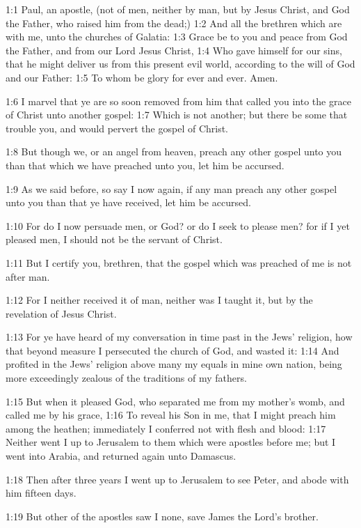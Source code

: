 

1:1 Paul, an apostle, (not of men, neither by man, but by Jesus
Christ, and God the Father, who raised him from the dead;) 1:2 And all
the brethren which are with me, unto the churches of Galatia: 1:3
Grace be to you and peace from God the Father, and from our Lord Jesus
Christ, 1:4 Who gave himself for our sins, that he might deliver us
from this present evil world, according to the will of God and our
Father: 1:5 To whom be glory for ever and ever. Amen.

1:6 I marvel that ye are so soon removed from him that called you into
the grace of Christ unto another gospel: 1:7 Which is not another; but
there be some that trouble you, and would pervert the gospel of
Christ.

1:8 But though we, or an angel from heaven, preach any other gospel
unto you than that which we have preached unto you, let him be
accursed.

1:9 As we said before, so say I now again, if any man preach any other
gospel unto you than that ye have received, let him be accursed.

1:10 For do I now persuade men, or God? or do I seek to please men?
for if I yet pleased men, I should not be the servant of Christ.

1:11 But I certify you, brethren, that the gospel which was preached
of me is not after man.

1:12 For I neither received it of man, neither was I taught it, but by
the revelation of Jesus Christ.

1:13 For ye have heard of my conversation in time past in the Jews'
religion, how that beyond measure I persecuted the church of God, and
wasted it: 1:14 And profited in the Jews' religion above many my
equals in mine own nation, being more exceedingly zealous of the
traditions of my fathers.

1:15 But when it pleased God, who separated me from my mother's womb,
and called me by his grace, 1:16 To reveal his Son in me, that I might
preach him among the heathen; immediately I conferred not with flesh
and blood: 1:17 Neither went I up to Jerusalem to them which were
apostles before me; but I went into Arabia, and returned again unto
Damascus.

1:18 Then after three years I went up to Jerusalem to see Peter, and
abode with him fifteen days.

1:19 But other of the apostles saw I none, save James the Lord's
brother.

